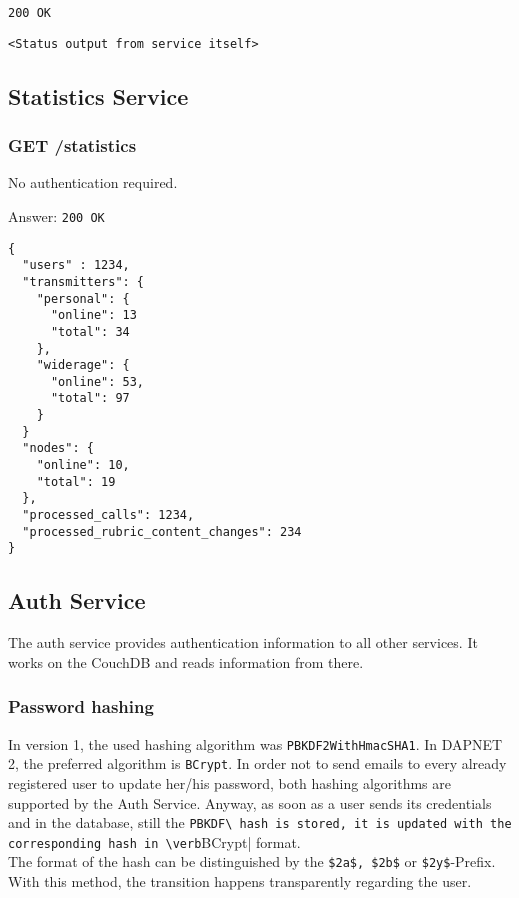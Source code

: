 \texttt{200 OK}
\begin{lstlisting}
<Status output from service itself>
\end{lstlisting}


\subsection{Statistics Service}

\subsubsection{GET /statistics}
No authentication required.

Answer:
\texttt{200 OK}
\begin{lstlisting}
{
  "users" : 1234,
  "transmitters": {
    "personal": {
      "online": 13
      "total": 34
    },
    "widerage": {
      "online": 53,
      "total": 97
    }
  }
  "nodes": {
    "online": 10,
    "total": 19
  },
  "processed_calls": 1234,
  "processed_rubric_content_changes": 234
}
\end{lstlisting}


\newpage
\subsection{Auth Service}
\label{protocoldef:Auth}
The auth service provides authentication information to all other services. It works on the CouchDB and reads information from there.

\subsubsection{Password hashing}
In version 1, the used hashing algorithm was \verb|PBKDF2WithHmacSHA1|. In DAPNET 2, the preferred algorithm is \verb|BCrypt|. In order not to send emails to every already registered user to update her/his password, both hashing algorithms are supported by the Auth Service. Anyway, as soon as a user sends its credentials and in the database, still the \verb|PBKDF\ hash is stored, it is updated with the corresponding hash in \verb|BCrypt| format.\\
The format of the hash can be distinguished by the \verb|$2a$, $2b$| or \verb|$2y$|-Prefix. With this method, the transition happens transparently regarding the user.

